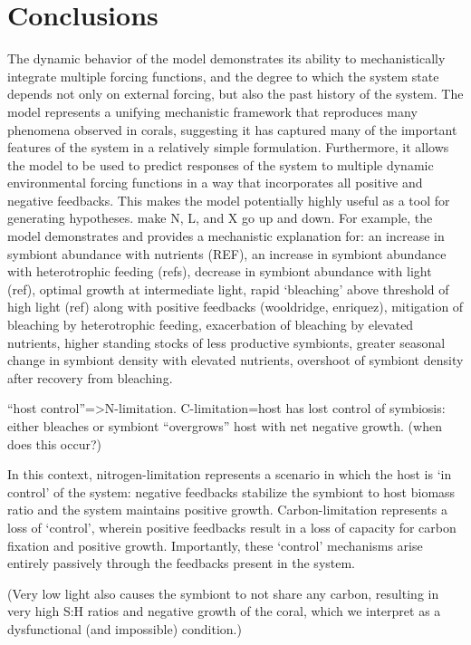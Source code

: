 \documentclass[]{elsarticle} %
\begin{document}
\section{Conclusions}\label{conclusions}

The dynamic behavior of the model demonstrates its ability to
mechanistically integrate multiple forcing functions, and the degree to
which the system state depends not only on external forcing, but also
the past history of the system. The model represents a unifying
mechanistic framework that reproduces many phenomena observed in corals,
suggesting it has captured many of the important features of the system
in a relatively simple formulation. Furthermore, it allows the model to
be used to predict responses of the system to multiple dynamic
environmental forcing functions in a way that incorporates all positive
and negative feedbacks. This makes the model potentially highly useful
as a tool for generating hypotheses. make N, L, and X go up and down.
For example, the model demonstrates and provides a mechanistic
explanation for: an increase in symbiont abundance with nutrients (REF),
an increase in symbiont abundance with heterotrophic feeding (refs),
decrease in symbiont abundance with light (ref), optimal growth at
intermediate light, rapid `bleaching' above threshold of high light
(ref) along with positive feedbacks (wooldridge, enriquez), mitigation
of bleaching by heterotrophic feeding, exacerbation of bleaching by
elevated nutrients, higher standing stocks of less productive symbionts,
greater seasonal change in symbiont density with elevated nutrients,
overshoot of symbiont density after recovery from bleaching.

``host control''=\textgreater{}N-limitation. C-limitation=host has lost
control of symbiosis: either bleaches or symbiont ``overgrows'' host
with net negative growth. (when does this occur?)

In this context, nitrogen-limitation represents a scenario in which the
host is `in control' of the system: negative feedbacks stabilize the
symbiont to host biomass ratio and the system maintains positive growth.
Carbon-limitation represents a loss of `control', wherein positive
feedbacks result in a loss of capacity for carbon fixation and positive
growth. Importantly, these `control' mechanisms arise entirely passively
through the feedbacks present in the system.

(Very low light also causes the symbiont to not share any carbon,
resulting in very high S:H ratios and negative growth of the coral,
which we interpret as a dysfunctional (and impossible) condition.)
\end{document}
